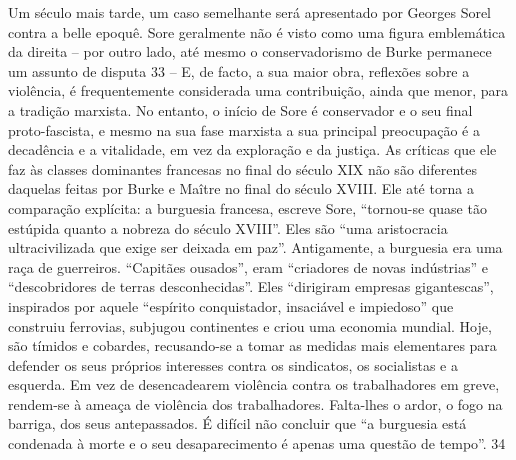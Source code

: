 Um século mais tarde, um caso semelhante será apresentado por Georges Sorel contra a belle epoquê. Sore geralmente não é visto como uma figura emblemática da direita – por outro lado, até mesmo o conservadorismo de Burke permanece um assunto de disputa
 {\color{blue} 33}  
– E, de facto, a sua maior obra, reflexões sobre a violência, é frequentemente considerada uma contribuição, ainda que menor, para a tradição marxista. No entanto, o início de Sore é conservador e o seu final proto-fascista, e mesmo na sua fase marxista a sua principal preocupação é a decadência e a vitalidade, em vez da exploração e da justiça. As críticas que ele faz às classes dominantes francesas no final do século XIX não são diferentes daquelas feitas por Burke e Maître no final do século XVIII. Ele até torna a comparação explícita: a burguesia francesa, escreve Sore, “tornou-se quase tão estúpida quanto a nobreza do século XVIII”. Eles são “uma aristocracia ultracivilizada que exige ser deixada em paz”. Antigamente, a burguesia era uma raça de guerreiros. “Capitães ousados”, eram “criadores de novas indústrias” e “descobridores de terras desconhecidas”. Eles “dirigiram empresas gigantescas”, inspirados por aquele “espírito conquistador, insaciável e impiedoso” que construiu ferrovias, subjugou continentes e criou uma economia mundial. Hoje, são tímidos e cobardes, recusando-se a tomar as medidas mais elementares para defender os seus próprios interesses contra os sindicatos, os socialistas e a esquerda. Em vez de desencadearem violência contra os trabalhadores em greve, rendem-se à ameaça de violência dos trabalhadores. Falta-lhes o ardor, o fogo na barriga, dos seus antepassados. É difícil não concluir que “a burguesia está condenada à morte e o seu desaparecimento é apenas uma questão de tempo”.
 {\color{blue} 34}  

 
\par
 
